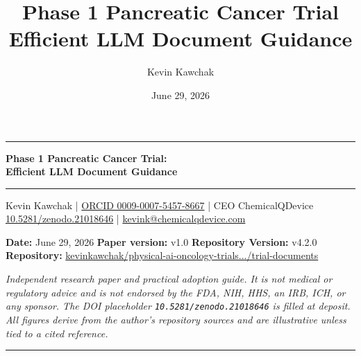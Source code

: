 \documentclass[11pt]{article}
\title{Phase 1 Pancreatic Cancer Trial Efficient LLM Document Guidance}
\author{Kevin Kawchak}
\date{June 29, 2026}
\begin{document}
\thispagestyle{plain}

\begin{center}
{\color{paperblack}\rule{\linewidth}{1.6pt}}
{\LARGE\bfseries Phase 1 Pancreatic Cancer Trial:\\ \vspace{0.2cm}Efficient LLM Document Guidance}\\
[-0.15em]
{\color{paperblack}\rule{\linewidth}{1.6pt}}
\end{center}

\vspace{-0.65cm}

\begin{center}\small
Kevin Kawchak \;|\; \href{https://orcid.org/0009-0007-5457-8667}{ORCID 0009-0007-5457-8667} \;|\;
CEO ChemicalQDevice \\
\href{https://doi.org/10.5281/zenodo.21018646}{10.5281/zenodo.21018646} \;|\;
\href{mailto:kevink@chemicalqdevice.com}{kevink@chemicalqdevice.com}
\end{center}

\vspace{-0.7cm}

\begin{center}\footnotesize
\textbf{Date:} June 29, 2026 \quad
\textbf{Paper version:} v1.0 \quad
\textbf{Repository Version:} v4.2.0\\
\textbf{Repository:} \href{https://github.com/kevinkawchak/physical-ai-oncology-trials/tree/main/trial-documents}{kevinkawchak/physical-ai-oncology-trials.../trial-documents}
\end{center}

\vspace{-0.3cm}

\noindent\footnotesize\textit{Independent research paper and practical adoption
guide. It is not medical or regulatory advice and is not endorsed by the FDA, NIH,
HHS, an IRB, ICH, or any sponsor. The DOI placeholder
\texttt{10.5281/zenodo.21018646} is filled at deposit. All figures derive from the
author's repository sources and are illustrative unless tied to a cited
reference.}\normalsize\par

\vspace{-0.3em}
{\color{paperblack}\rule{\linewidth}{1.6pt}}

\vspace{-0.2cm}


\clearpage
\end{document}

